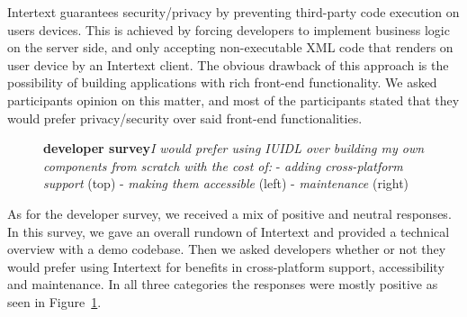 Intertext guarantees security/privacy by preventing third-party code execution on users devices. This is achieved by forcing developers to implement business logic on the server side, and only accepting non-executable XML code that renders on user device by an Intertext client. The obvious drawback of this approach is the possibility of building applications with rich front-end functionality. We asked participants opinion on this matter, and most of the participants stated that they would prefer privacy/security over said front-end functionalities.


\begin{figure}[H]
\centering
{}
\vspace*{-1mm}
\caption{\textbf{developer survey}\newline\textit{I would prefer using IUIDL over building my own components from scratch with the cost of:}
\newline- \textit{adding cross-platform support} (top)
\newline- \textit{making them accessible} (left)
\newline- \textit{maintenance} (right)} \label{fig:ev_p2_7}
\end{figure}

As for the developer survey, we received a mix of positive and neutral responses. In this survey, we gave an overall rundown of Intertext and provided a technical overview with a demo codebase. Then we asked developers whether or not they would prefer using Intertext for benefits in cross-platform support, accessibility and maintenance. In all three categories the responses were mostly positive as seen in Figure~\ref{fig:ev_p2_7}.